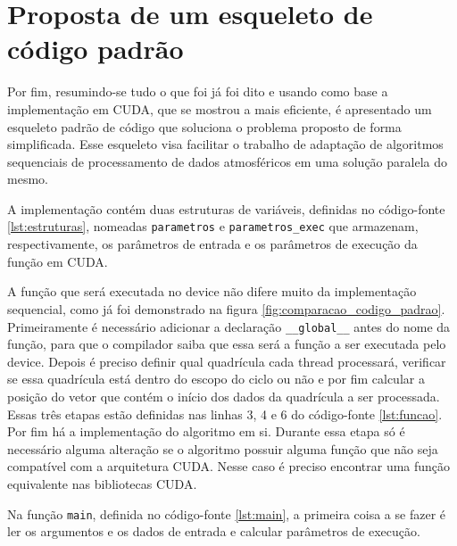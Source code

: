 \chapter{Proposta de um esqueleto de código padrão}

Por fim, resumindo-se tudo o que foi já foi dito e usando como base a implementação em CUDA, que se mostrou a mais eficiente, é apresentado um esqueleto padrão de código que soluciona o problema proposto de forma simplificada. Esse esqueleto visa facilitar o trabalho de adaptação de algoritmos sequenciais de processamento de dados atmosféricos em uma solução paralela do mesmo.

A implementação contém duas estruturas de variáveis, definidas no código-fonte \ref{lst:estruturas}, nomeadas \texttt{parametros} e \texttt{parametros\_exec} que armazenam, respectivamente, os parâmetros de entrada e os parâmetros de execução da função em CUDA.



A função que será executada no device não difere muito da implementação sequencial, como já foi demonstrado na figura \ref{fig:comparacao_codigo_padrao}. Primeiramente é necessário adicionar a declaração \texttt{\_\_global\_\_} antes do nome da função, para que o compilador saiba que essa será a função a ser executada pelo device. Depois é preciso definir qual quadrícula cada thread processará, verificar se essa quadrícula está dentro do escopo do ciclo ou não e por fim calcular a posição do vetor que contém o início dos dados da quadrícula a ser processada. Essas três etapas estão definidas nas linhas 3, 4 e 6 do código-fonte \ref{lst:funcao}. Por fim há a implementação do algoritmo em si. Durante essa etapa só é necessário alguma alteração se o algoritmo possuir alguma função que não seja compatível com a arquitetura CUDA. Nesse caso é preciso encontrar uma função equivalente nas bibliotecas CUDA.



Na função \texttt{main}, definida no código-fonte \ref{lst:main}, a primeira coisa a se fazer é ler os argumentos e os dados de entrada e calcular parâmetros de execução.

